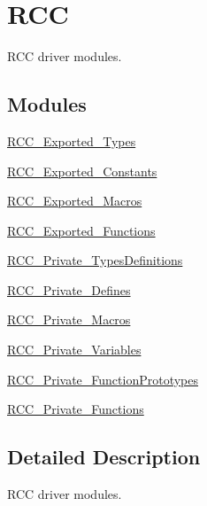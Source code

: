 \hypertarget{group___r_c_c}{}\section{R\+CC}
\label{group___r_c_c}


R\+CC driver modules.  


\subsection*{Modules}
\begin{DoxyCompactItemize}
\item 
\hyperlink{group___r_c_c___exported___types}{R\+C\+C\+\_\+\+Exported\+\_\+\+Types}
\item 
\hyperlink{group___r_c_c___exported___constants}{R\+C\+C\+\_\+\+Exported\+\_\+\+Constants}
\item 
\hyperlink{group___r_c_c___exported___macros}{R\+C\+C\+\_\+\+Exported\+\_\+\+Macros}
\item 
\hyperlink{group___r_c_c___exported___functions}{R\+C\+C\+\_\+\+Exported\+\_\+\+Functions}
\item 
\hyperlink{group___r_c_c___private___types_definitions}{R\+C\+C\+\_\+\+Private\+\_\+\+Types\+Definitions}
\item 
\hyperlink{group___r_c_c___private___defines}{R\+C\+C\+\_\+\+Private\+\_\+\+Defines}
\item 
\hyperlink{group___r_c_c___private___macros}{R\+C\+C\+\_\+\+Private\+\_\+\+Macros}
\item 
\hyperlink{group___r_c_c___private___variables}{R\+C\+C\+\_\+\+Private\+\_\+\+Variables}
\item 
\hyperlink{group___r_c_c___private___function_prototypes}{R\+C\+C\+\_\+\+Private\+\_\+\+Function\+Prototypes}
\item 
\hyperlink{group___r_c_c___private___functions}{R\+C\+C\+\_\+\+Private\+\_\+\+Functions}
\end{DoxyCompactItemize}


\subsection{Detailed Description}
R\+CC driver modules. 

